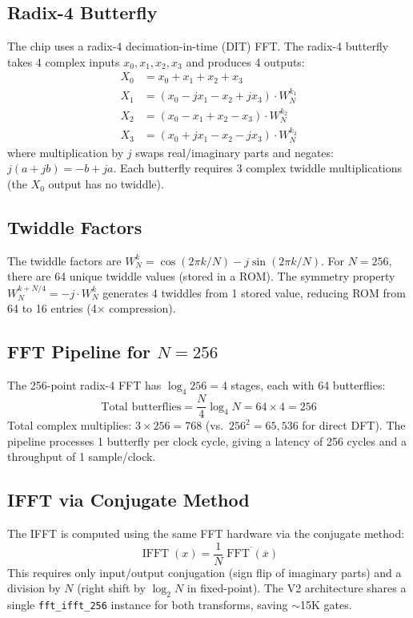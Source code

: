 \documentclass[11pt,a4paper]{article}
\theoremstyle{definition}
\theoremstyle{remark}
\newcommand{\conj}[1]{\overline{#1}}
\newcommand{\FFT}{\operatorname{FFT}}
\newcommand{\IFFT}{\operatorname{IFFT}}
\begin{document}
\subsection{Radix-4 Butterfly}

The chip uses a radix-4 decimation-in-time (DIT) FFT. The radix-4 butterfly takes
4 complex inputs $x_0, x_1, x_2, x_3$ and produces 4 outputs:
\begin{align}
  X_0 &= x_0 + x_1 + x_2 + x_3 \\
  X_1 &= (x_0 - j x_1 - x_2 + j x_3) \cdot W_N^{k_1} \\
  X_2 &= (x_0 - x_1 + x_2 - x_3) \cdot W_N^{k_2} \\
  X_3 &= (x_0 + j x_1 - x_2 - j x_3) \cdot W_N^{k_3}
  \label{eq:radix4}
\end{align}
where multiplication by $j$ swaps real/imaginary parts and negates:
$j(a + jb) = -b + ja$. Each butterfly requires 3 complex twiddle multiplications
(the $X_0$ output has no twiddle).

\subsection{Twiddle Factors}

The twiddle factors are $W_N^k = \cos(2\pi k / N) - j \sin(2\pi k / N)$. For $N=256$,
there are 64 unique twiddle values (stored in a ROM). The symmetry property
$W_N^{k+N/4} = -j \cdot W_N^k$ generates 4 twiddles from 1 stored value, reducing
ROM from 64 to 16 entries (4$\times$ compression).

\subsection{FFT Pipeline for $N=256$}

The 256-point radix-4 FFT has $\log_4 256 = 4$ stages, each with 64 butterflies:
\begin{equation}
  \text{Total butterflies} = \frac{N}{4} \log_4 N = 64 \times 4 = 256
\end{equation}
Total complex multiplies: $3 \times 256 = 768$ (vs.\ $256^2 = 65{,}536$ for direct
DFT). The pipeline processes 1 butterfly per clock cycle, giving a latency of
256 cycles and a throughput of 1 sample/clock.

\subsection{IFFT via Conjugate Method}

The IFFT is computed using the same FFT hardware via the conjugate method:
\begin{equation}
  \IFFT(x) = \frac{1}{N} \conj{\FFT(\conj{x})}
  \label{eq:ifft_conj}
\end{equation}
This requires only input/output conjugation (sign flip of imaginary parts) and
a division by $N$ (right shift by $\log_2 N$ in fixed-point). The V2 architecture
shares a single \texttt{fft\_ifft\_256} instance for both transforms, saving
$\sim$15K gates.
\end{document}
